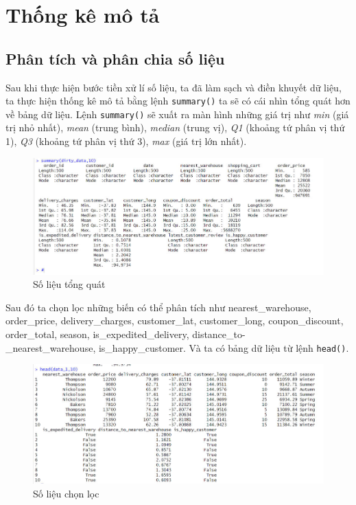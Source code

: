 \section{Thống kê mô tả}
\subsection{Phân tích và phân chia số liệu}
Sau khi thực hiện bước tiền xử lí số liệu, ta đã làm sạch và điền khuyết dữ liệu, ta thực hiện thống kê mô tả bằng lệnh \texttt{summary()} ta sẽ có cái nhìn tổng quát hơn về bảng dữ liệu. Lệnh \texttt{summary()} sẽ xuất ra màn hình những giá trị như \textit{min} (giá trị nhỏ nhất), \textit{mean} (trung bình), \textit{median} (trung vị), \textit{Q1} (khoảng tứ phân vị thứ 1), \textit{Q3} (khoảng tứ phân vị thứ 3), \textit{max} (giá trị lớn nhất).
\begin{figure}[H]
    \centering
    \includegraphics[width=0.9\linewidth]{graphics/bang1.jpg}
    \caption{Số liệu tổng quát}
    
\end{figure}
Sau đó ta chọn lọc những biến có thể phân tích như nearest\_warehouse, order\_price, delivery\_charges, customer\_lat, customer\_long, coupon\_discount, order\_total, season, is\_expedited\_delivery, distance\_to-\\\_nearest\_warehouse, is\_happy\_customer. Và ta có bảng dữ liệu từ lệnh \texttt{head()}.
\begin{figure}[H]
    \centering
    \includegraphics[width=0.9\linewidth]{graphics/bang2.jpg}
    \caption{Số liệu chọn lọc}
   
\end{figure}
            
